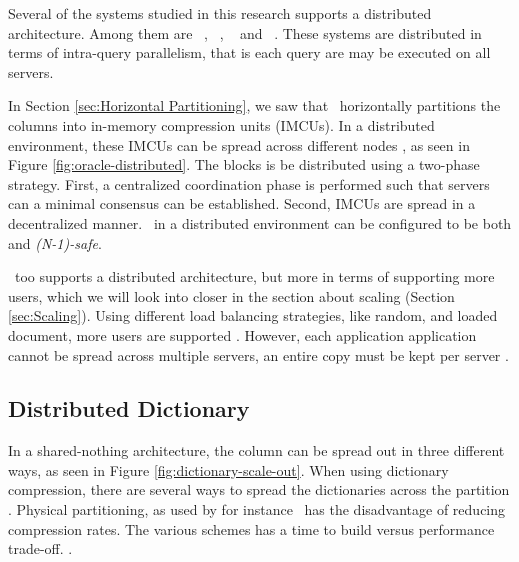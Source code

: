 Several of the systems studied in this research supports a distributed architecture. Among them are \oracle~\cite{Mukherjee2015-ul}, \cstore~\cite{Stonebraker2005-qz}, \saph~\cite{Farber2012-vh} and \exasol~\cite{Exasol2014-xh}. These systems are distributed in terms of intra-query parallelism, that is each query are may be executed on all servers.

In Section \ref{sec:Horizontal Partitioning}, we saw that \oracle~horizontally partitions the columns into in-memory compression units (IMCUs). In a distributed environment, these IMCUs can be spread across different nodes \cite{Mukherjee2015-ul}, as seen in Figure \ref{fig:oracle-distributed}. The blocks is be distributed using a two-phase strategy. First, a centralized coordination phase is performed such that servers can a minimal consensus can be established. Second, IMCUs are spread in a decentralized manner. \oracle~in a distributed environment can be configured to be both and \textit{(N-1)-safe}.


\qlikview~too supports a distributed architecture, but more in terms of supporting more users, which we will look into closer in the section about scaling (Section \ref{sec:Scaling}). Using different load balancing strategies, like random, and loaded document, more users are supported \cite{Qlik2012-ku}. However, each application application cannot be spread across multiple servers, an entire copy must be kept per server . 

\subsection{Distributed Dictionary}
\label{sub:Distributed Dictionary}
In a shared-nothing architecture, the column can be spread out in three different ways, as seen in Figure \ref{fig:dictionary-scale-out}. When using dictionary compression, there are several ways to spread the dictionaries across the partition \cite{Psaroudakis2015-lc}. Physical partitioning, as used by for instance \oracle~has the disadvantage of reducing compression rates. The various schemes has a time to build versus performance trade-off. .

